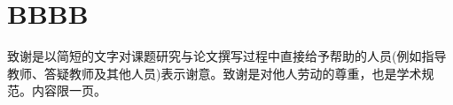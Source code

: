\documentclass[type = master,class = academic]{whu-thesis}
\begin{document}
\tableofcontents %


\mainmatter


\chapter{BBBB}


\printbibliography

\begin{acknowledgements}
  致谢是以简短的文字对课题研究与论文撰写过程中直接给予帮助的人员(例如指导教师、答疑教师及其他人员)表示谢意。致谢是对他人劳动的尊重，也是学术规范。内容限一页。
\end{acknowledgements}

\appendix


\end{document}
